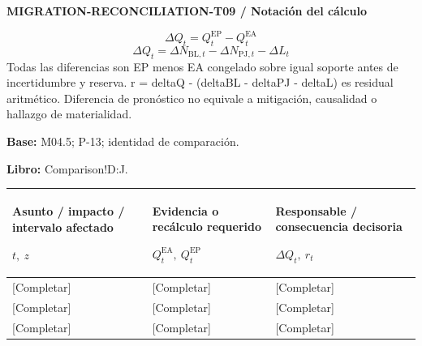 \par\begingroup\sffamily\fontsize{8}{10}\selectfont\color{NEBGreen}\setlength{\parskip}{2pt}\setlength{\abovedisplayskip}{4pt}\setlength{\belowdisplayskip}{4pt}\setlength{\abovedisplayshortskip}{2pt}\setlength{\belowdisplayshortskip}{3pt}
\textbf{MIGRATION-RECONCILIATION-T09 / Notación del cálculo}\par
{\fontsize{9}{11}\selectfont\[ \Delta Q_t=Q_t^{\mathrm{EP}}-Q_t^{\mathrm{EA}} \]}
{\fontsize{9}{11}\selectfont\[ \Delta Q_t=\Delta N_{\mathrm{BL},t}-\Delta N_{\mathrm{PJ},t}-\Delta L_t \]}
Todas las diferencias son EP menos EA congelado sobre igual soporte antes de incertidumbre y reserva. r = deltaQ - (deltaBL - deltaPJ - deltaL) es residual aritmético. Diferencia de pronóstico no equivale a mitigación, causalidad o hallazgo de materialidad.\par
\textbf{Base:} M04.5; P-13; identidad de comparación.\par
\textbf{Libro:} Comparison!D:J.\par\endgroup
{\sffamily\fontsize{8.3}{10.3}\selectfont\begin{longtable}{@{}P{54.83mm} P{54.83mm} P{54.83mm}@{}}
\toprule
\textbf{Asunto / impacto / intervalo afectado}\par {\normalfont\fontsize{8.2}{10}\selectfont $t,\ z$} & \textbf{Evidencia o recálculo requerido}\par {\normalfont\fontsize{8.2}{10}\selectfont $Q_t^{\mathrm{EA}},\ Q_t^{\mathrm{EP}}$} & \textbf{Responsable / consecuencia decisoria}\par {\normalfont\fontsize{8.2}{10}\selectfont $\Delta Q_t,\ r_t$}\\\midrule\endhead
\rule{0pt}{8mm}[Completar] & [Completar] & [Completar]\\\hline
\rule{0pt}{8mm}[Completar] & [Completar] & [Completar]\\\hline
\rule{0pt}{8mm}[Completar] & [Completar] & [Completar]\\\hline
\end{longtable}}
